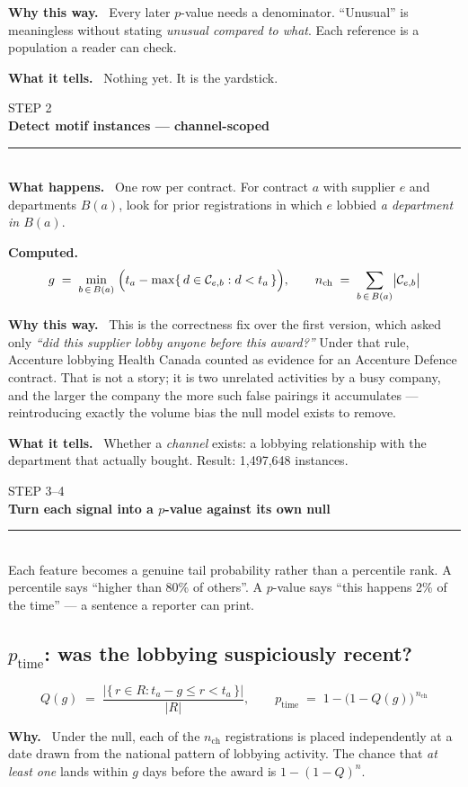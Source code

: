 \documentclass[11pt,a4paper]{article}
\newcommand{\stephead}[2]{%
  \vspace{1.1em}\noindent
  {\color{slate}\ttfamily\footnotesize STEP #1}\\[-0.15em]
  {\large\bfseries\color{pine} #2}\\[0.25em]
  {\color{rulec}\rule{\linewidth}{0.6pt}}\\[0.3em]}
\newcommand{\field}[1]{\smallskip\noindent\textbf{#1}\ }
\begin{document}
\field{Why this way.}
Every later $p$-value needs a denominator. ``Unusual'' is meaningless without stating
\emph{unusual compared to what}. Each reference is a population a reader can check.

\field{What it tells.} Nothing yet. It is the yardstick.

\stephead{2}{Detect motif instances --- channel-scoped}

\field{What happens.}
One row per contract. For contract $a$ with supplier $e$ and departments $B(a)$, look
for prior registrations in which $e$ lobbied \emph{a department in $B(a)$}.

\field{Computed.}
\[
g \;=\; \min_{b\,\in\,B(a)}\;\Bigl(t_a - \max\{\,d \in \mathcal{C}_{e,b} : d < t_a \,\}\Bigr),
\qquad
n_{\mathrm{ch}} \;=\; \sum_{b\,\in\,B(a)} \bigl|\mathcal{C}_{e,b}\bigr|
\]

\field{Why this way.}
This is the correctness fix over the first version, which asked only \emph{``did this
supplier lobby anyone before this award?''} Under that rule, Accenture lobbying Health
Canada counted as evidence for an Accenture Defence contract. That is not a story; it is
two unrelated activities by a busy company, and the larger the company the more such
false pairings it accumulates --- reintroducing exactly the volume bias the null model
exists to remove.

\field{What it tells.}
Whether a \emph{channel} exists: a lobbying relationship with the department that
actually bought. Result: 1{,}497{,}648 instances.

\stephead{3--4}{Turn each signal into a $p$-value against its own null}

Each feature becomes a genuine tail probability rather than a percentile rank. A
percentile says ``higher than 80\% of others''. A $p$-value says ``this happens 2\% of
the time'' --- a sentence a reporter can print.

\subsection*{$p_{\mathrm{time}}$: was the lobbying suspiciously recent?}
\[
Q(g) \;=\; \frac{\bigl|\{\, r \in R : t_a - g \le r < t_a \,\}\bigr|}{|R|},
\qquad
p_{\mathrm{time}} \;=\; 1-\bigl(1-Q(g)\bigr)^{\,n_{\mathrm{ch}}}
\]

\field{Why.}
Under the null, each of the $n_{\mathrm{ch}}$ registrations is placed independently at a
date drawn from the national pattern of lobbying activity. The chance that
\emph{at least one} lands within $g$ days before the award is $1-(1-Q)^n$.
\end{document}
